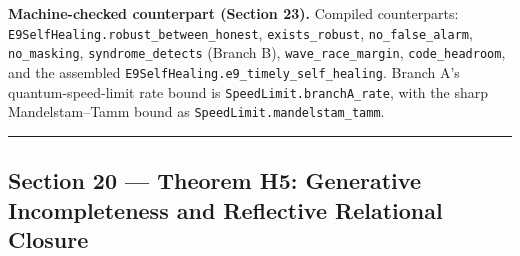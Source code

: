 \documentclass[
]{article}
\begin{document}
\textbf{Machine-checked counterpart (Section 23).} Compiled
counterparts:
\texttt{E\allowbreak{}9\allowbreak{}S\allowbreak{}e\allowbreak{}l\allowbreak{}f\allowbreak{}H\allowbreak{}e\allowbreak{}a\allowbreak{}l\allowbreak{}i\allowbreak{}n\allowbreak{}g\allowbreak{}.\allowbreak{}r\allowbreak{}o\allowbreak{}b\allowbreak{}u\allowbreak{}s\allowbreak{}t\allowbreak{}\_\allowbreak{}b\allowbreak{}e\allowbreak{}t\allowbreak{}w\allowbreak{}e\allowbreak{}e\allowbreak{}n\allowbreak{}\_\allowbreak{}h\allowbreak{}o\allowbreak{}n\allowbreak{}e\allowbreak{}s\allowbreak{}t},
\texttt{exists\_robust}, \texttt{no\_false\_alarm},
\texttt{no\_masking}, \texttt{syndrome\_detects} (Branch B),
\texttt{wave\_race\_margin}, \texttt{code\_headroom}, and the assembled
\texttt{E\allowbreak{}9\allowbreak{}S\allowbreak{}e\allowbreak{}l\allowbreak{}f\allowbreak{}H\allowbreak{}e\allowbreak{}a\allowbreak{}l\allowbreak{}i\allowbreak{}n\allowbreak{}g\allowbreak{}.\allowbreak{}e\allowbreak{}9\allowbreak{}\_\allowbreak{}t\allowbreak{}i\allowbreak{}m\allowbreak{}e\allowbreak{}l\allowbreak{}y\allowbreak{}\_\allowbreak{}s\allowbreak{}e\allowbreak{}l\allowbreak{}f\allowbreak{}\_\allowbreak{}h\allowbreak{}e\allowbreak{}a\allowbreak{}l\allowbreak{}i\allowbreak{}n\allowbreak{}g}.
Branch A's quantum-speed-limit rate bound is
\texttt{S\allowbreak{}p\allowbreak{}e\allowbreak{}e\allowbreak{}d\allowbreak{}L\allowbreak{}i\allowbreak{}m\allowbreak{}i\allowbreak{}t\allowbreak{}.\allowbreak{}b\allowbreak{}r\allowbreak{}a\allowbreak{}n\allowbreak{}c\allowbreak{}h\allowbreak{}A\allowbreak{}\_\allowbreak{}r\allowbreak{}a\allowbreak{}t\allowbreak{}e},
with the sharp Mandelstam--Tamm bound as
\texttt{S\allowbreak{}p\allowbreak{}e\allowbreak{}e\allowbreak{}d\allowbreak{}L\allowbreak{}i\allowbreak{}m\allowbreak{}i\allowbreak{}t\allowbreak{}.\allowbreak{}m\allowbreak{}a\allowbreak{}n\allowbreak{}d\allowbreak{}e\allowbreak{}l\allowbreak{}s\allowbreak{}t\allowbreak{}a\allowbreak{}m\allowbreak{}\_\allowbreak{}t\allowbreak{}a\allowbreak{}m\allowbreak{}m}.

\begin{center}\rule{0.5\linewidth}{0.5pt}\end{center}

\subsection{Section 20 --- Theorem H5: Generative Incompleteness and
Reflective Relational
Closure}\label{section-20-theorem-h5-generative-incompleteness-and-reflective-relational-closure}
\end{document}
